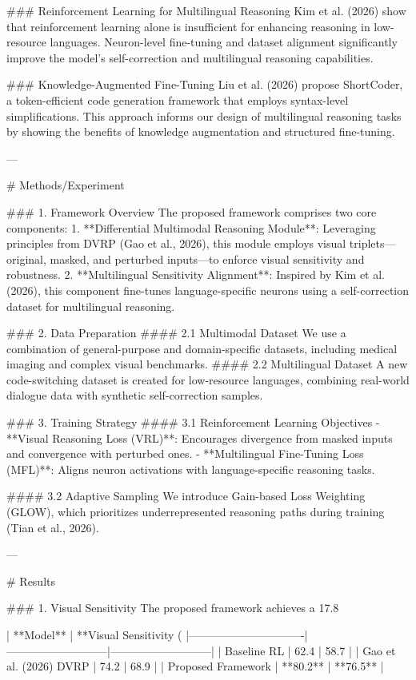 ### Reinforcement Learning for Multilingual Reasoning  
Kim et al. (2026) show that reinforcement learning alone is insufficient for enhancing reasoning in low-resource languages. Neuron-level fine-tuning and dataset alignment significantly improve the model's self-correction and multilingual reasoning capabilities.

### Knowledge-Augmented Fine-Tuning  
Liu et al. (2026) propose ShortCoder, a token-efficient code generation framework that employs syntax-level simplifications. This approach informs our design of multilingual reasoning tasks by showing the benefits of knowledge augmentation and structured fine-tuning.

---

# Methods/Experiment  

### 1. Framework Overview  
The proposed framework comprises two core components:  
1. **Differential Multimodal Reasoning Module**: Leveraging principles from DVRP (Gao et al., 2026), this module employs visual triplets—original, masked, and perturbed inputs—to enforce visual sensitivity and robustness.  
2. **Multilingual Sensitivity Alignment**: Inspired by Kim et al. (2026), this component fine-tunes language-specific neurons using a self-correction dataset for multilingual reasoning.

### 2. Data Preparation  
#### 2.1 Multimodal Dataset  
We use a combination of general-purpose and domain-specific datasets, including medical imaging and complex visual benchmarks.  
#### 2.2 Multilingual Dataset  
A new code-switching dataset is created for low-resource languages, combining real-world dialogue data with synthetic self-correction samples.

### 3. Training Strategy  
#### 3.1 Reinforcement Learning Objectives  
- **Visual Reasoning Loss (VRL)**: Encourages divergence from masked inputs and convergence with perturbed ones.  
- **Multilingual Fine-Tuning Loss (MFL)**: Aligns neuron activations with language-specific reasoning tasks.  

#### 3.2 Adaptive Sampling  
We introduce Gain-based Loss Weighting (GLOW), which prioritizes underrepresented reasoning paths during training (Tian et al., 2026).

---

# Results  

### 1. Visual Sensitivity  
The proposed framework achieves a 17.8%

| **Model**                     | **Visual Sensitivity (%
|-------------------------------|---------------------------|---------------------------|  
| Baseline RL                   | 62.4                      | 58.7                      |  
| Gao et al. (2026) DVRP        | 74.2                      | 68.9                      |  
| Proposed Framework            | **80.2**                  | **76.5**                  |  

